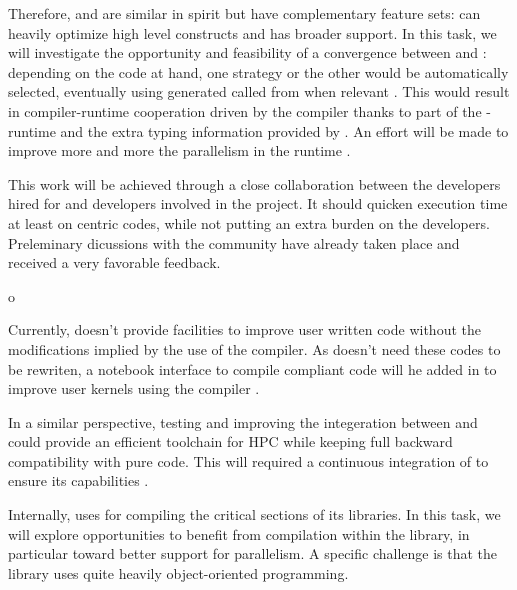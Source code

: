 \begin{workpackage}[id=hpc,wphases=36-48,
  title=High Performance Computing,
  PSRM=1, %
  LLRM=12, %
  SARM=1, %
  UKRM=1, %
  UBRM=1, %
  UJFRM=12]
\begin{tasklist}
\begin{task}[title=Pythran-Cython convergence,id=pythran_cython]
  Therefore, \Pythran and \Cython are similar in spirit but have
  complementary feature sets: \Pythran can heavily optimize high level
  \Numpy constructs and \Cython has broader \Python support. In this
  task, we will investigate the opportunity and feasibility of a
  convergence between \Cython and \Pythran: depending on the code at
  hand, one strategy or the other would be automatically selected,
  eventually using \Pythran generated called from \Cython when
  relevant . This would result in compiler-runtime
  cooperation driven by the \Cython compiler thanks to part of the
  \Pythran-runtime and the extra typing information provided by \Cython. An
  effort will be made to improve more and more the parallelism in the
  \Pythran runtime .

  This work will be achieved through a close collaboration between the \Pythran
  developers hired for \TheProject and \Cython developers involved in the \Sage
  project. It should quicken \Sage execution time at least on \Numpy centric
  codes, while not putting an extra burden on the developers.  Preleminary
  dicussions with the \Cython community have already taken place and received a
  very favorable feedback.
\end{task}

\begin{task}[title=\Pythran for \Sage and \Sage Users,id=pythran_sage]o

  Currently, \Sage doesn't provide facilities to improve user written
  \Python code without the modifications implied by the use of the \Cython
  compiler. As \Pythran doesn't need these codes to be rewriten, a notebook
  interface to compile \Pythran compliant code will he added in \Sage to
  improve user kernels using the \Pythran compiler .

  In a similar perspective, testing and improving the integeration between
   and \Pythran could provide an efficient toolchain for HPC
  while keeping full backward compatibility with pure \Python code. This will
  required a continuous integration of \Pythran to ensure its capabilities
  .

  Internally, \Sage uses \Cython for compiling the critical sections of
  its libraries. In this task, we will explore opportunities to
  benefit from \Pythran compilation within the \Sage library, in
  particular toward better support for parallelism. A specific
  challenge is that the \Sage library uses quite heavily
  object-oriented programming.


\end{task}
\end{tasklist}
\end{workpackage}
